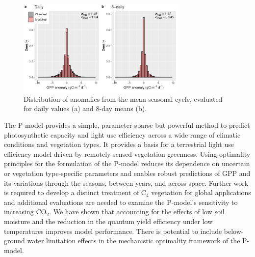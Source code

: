 \documentclass[gmd, manuscript]{copernicus}
\newcommand{\coo}{CO$_2$}
\begin{document}
\begin{figure}[t]
\includegraphics[width=8.3cm]{fig/hist_anomalies.pdf}
    \caption{Distribution of anomalies from the mean seasonal cycle, evaluated for daily values (a) and 8-day means (b).} 
    \label{fig:modobs_anomalies}
\end{figure}


\conclusions
The P-model provides a simple, parameter-sparse but powerful method to predict photosynthetic capacity and light use efficiency across a wide range of climatic conditions and vegetation types. It provides a basis for a terrestrial light use efficiency model driven by remotely sensed vegetation greenness. Using optimality principles for the formulation of the P-model reduces its dependence on uncertain or vegetation type-specific parameters and enables robust predictions of GPP and its variations through the seasons, between years, and across space. Further work is required to develop a distinct treatment of C$_4$ vegetation for global applications and additional evaluations are needed to examine the P-model's sensitivity to increasing \coo . We have shown that accounting for the effects of low soil moisture and the reduction in the quantum yield efficiency under low temperatures improves model performance. There is potential to include below-ground water limitation effects in the mechanistic optimality framework of the P-model. 

\clearpage
\end{document}
